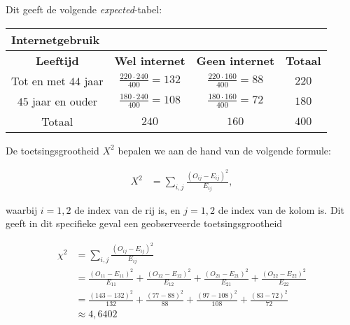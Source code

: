 \begin{enumerate}[label=(\alph*)]
{        Dit geeft de volgende \emph{expected}-tabel:

        \begin{center}
            \renewcommand{\arraystretch}{1.25}
            \begin{tabular}{cccc}
                \multicolumn{4}{l}{Internetgebruik} \\
                \toprule
                    {\bfseries Leeftijd} & {\bfseries Wel internet} & {\bfseries Geen internet} & {\bfseries Totaal} \\
                \cmidrule{1-1} \cmidrule{2-2} \cmidrule{3-3} \cmidrule{4-4}
                    Tot en met $44$ jaar & $\frac{220\cdot 240}{400}=132$ & $\frac{220\cdot 160}{400}=88$ & $220$ \\
                    $45$ jaar en ouder & $\frac{180\cdot 240}{400}=108$ & $\frac{180\cdot 160}{400}=72$ & $180$ \\
                \cmidrule{1-1} \cmidrule{2-2} \cmidrule{3-3} \cmidrule{4-4}
                    Totaal & $240$ & $160$ & $400$ \\
                \bottomrule
            \end{tabular}
        \end{center}

        De toetsingsgrootheid $X^2$ bepalen we aan de hand van de volgende formule:

        \begin{align*}
            X^2  &= \sum_{i,j} \frac{(O_{ij} - E_{ij})^2}{E_{ij}},
        \end{align*}

        waarbij $i = 1,2$ de index van de rij is, en $j = 1,2$ de index van de kolom is.
        Dit geeft in dit specifieke geval een geobserveerde toetsingsgrootheid 
        
        \begin{align*}
            \chi^2  &= \sum_{i,j} \frac{(O_{ij} - E_{ij})^2}{E_{ij}} \\
                    &=\frac{(O_{11} - E_{11})^2}{E_{11}} + \frac{(O_{12} - E_{12})^2}{E_{12}} + \frac{(O_{21} - E_{21})^2}{E_{21}} + \frac{(O_{22} - E_{22})^2}{E_{22}} \\
                    &= \frac{(143 - 132)^2}{132} + \frac{(77 - 88)^2}{88} + \frac{(97 - 108)^2}{108} + \frac{(83-72)^2}{72}\\
                    &\approx 4,6402
        \end{align*}

}
\end{enumerate}
